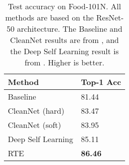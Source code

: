 \documentclass{article}
\renewcommand{\b}[1]{\textbf{#1}}
\begin{document}
\begin{table}\renewcommand{\arraystretch}{1.3}
\centering
\caption{Test accuracy on Food-101N. All methods are based on the ResNet-50 architecture. The Baseline and CleanNet results are from \cite{lee2018}, and the Deep Self Learning result is from \cite{han2019}. Higher is better.}
\label{tab:food101n}
\begin{tabular}{ll}
\toprule
Method             & Top-1 Acc     \\
\hline
Baseline           & 81.44 \\
CleanNet (hard)    & 83.47 \\
CleanNet (soft)    & 83.95 \\
Deep Self Learning & 85.11 \\
RTE                & \b{86.46} \\
\bottomrule
\end{tabular}
\end{table}
\end{document}
